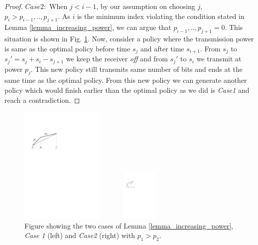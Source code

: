 \begin{proof}
$Case 2:$ When $j<i-1$, by our assumption on choosing $j$, $p_i>p_{i-1},..,p_{j+1}$. As $i$ is the minimum index violating the condition stated in Lemma \ref{lemma_increasing_power}, we can argue that $p_{i-1},..,p_{j+1}=0$. This situation is shown in Fig. \ref{Lemma1}. Now, consider a policy where the transmission power is same as the optimal policy before time $s_j$ and after time $s_{i+1}$. From $s_j$ to $s_j'=s_j+s_{i}-s_{j+1}$ we keep the receiver \textit{off} and from $s_j'$ to $s_{i}$ we transmit at power $p_j$. This new policy still transmits same number of bits and ends at the same time as the optimal policy. From this new policy we can generate another policy which would finish earlier than the optimal policy as we did is \textit{Case1} and reach a contradiction. 
\end{proof}

\begin{figure}[htb]
\begin{minipage}[b]{0.48\linewidth}
  \centering
  \centerline{\includegraphics[width=4cm]{Lemma1_case1.pdf}}
\end{minipage}
\begin{minipage}[b]{0.48\linewidth}
  \centering
  \centerline{\includegraphics[width=4cm,height=25mm]{Lemma1_case2.pdf}}
\end{minipage}
\caption{Figure showing the two cases of Lemma \ref{lemma_increasing_power}, \textit{Case 1} (left)  and \textit{Case2} (right) with $p_1>p_2$.}
\label{Lemma1}
\end{figure}

